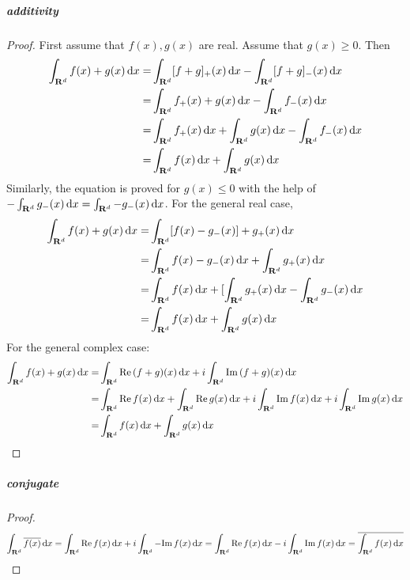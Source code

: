 \documentclass{article}
\begin{document}
\subparagraph{additivity}
\begin{proof}
First assume that $f(x),g(x)$ are real. Assume that $g(x)\geq 0$. Then
\[\begin{aligned}
\cit f(x)+g(x)\dx=&\cit [f+g]_+(x)\dx-\cit [f+g]_-(x)\dx\\
=&\cit f_+(x)+g(x)\dx-\cit f_-(x)\dx\\
=&\cit f_+(x)\dx+\cit g(x)\dx -\cit f_-(x)\dx\\
=&\cit f(x)\dx+\cit g(x) \dx
\end{aligned}\]
Similarly, the equation is proved for $g(x)\leq 0$ with the help of $-\cit g_-(x)\dx=\cit -g_-(x)\dx$.
For the general real case,
\[\begin{aligned}
\cit f(x)+g(x)\dx=&\cit [f(x)-g_-(x)]+g_+(x)\dx\\
=&\cit f(x)-g_-(x)\dx+\cit g_+(x)\dx\\
=&\cit f(x)\dx+[\cit g_+(x)\dx-\cit g_-(x)\dx\\
=&\cit f(x)\dx+\cit g(x)\dx
\end{aligned}\]
For the general complex case:
\[\begin{aligned}
\cit f(x)+g(x)\dx=&\cit \re (f+g)(x)\dx+i\cit \im (f+g)(x)\dx\\
=&\cit \re f(x)\dx+\cit \re g(x)\dx +i\cit \im f(x)\dx +i\cit \im g(x)\dx\\
=&\cit f(x)\dx+\cit g(x)\dx
\end{aligned}\]
\end{proof}
\subparagraph{conjugate}
\begin{proof}
\[\cit \overline{f(x)}\dx=\cit \re f(x)\dx+i\cit -\im f(x)\dx=\cit \re f(x)\dx-i\cit \im f(x)\dx=\overline{\cit f(x)\dx}\]
\end{proof}
\end{document}
